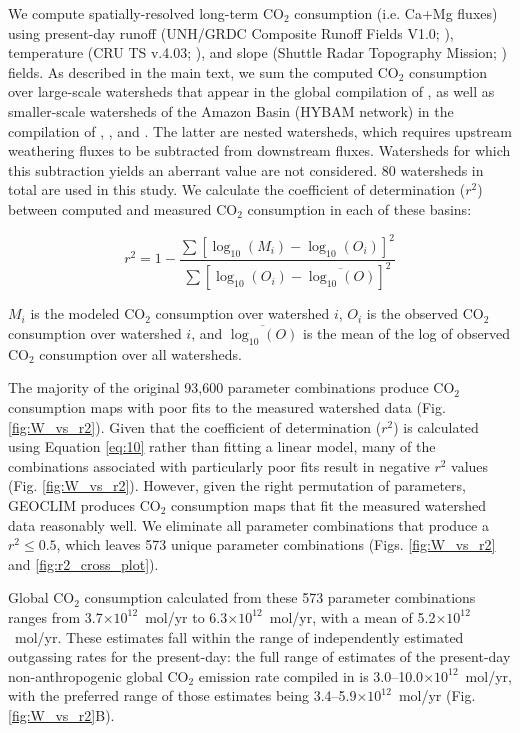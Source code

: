 \documentclass[11pt,letterpaper]{article}
\newcommand{\COtwo}{CO$_{2}$\xspace}
\begin{document}
We compute spatially-resolved long-term \COtwo consumption (i.e. Ca+Mg fluxes) using present-day runoff (UNH/GRDC Composite Runoff Fields V1.0; \citealp{Fekete1999a}), temperature (CRU TS v.4.03; \citealp{Harris2013a}), and slope (Shuttle Radar Topography Mission; \citealp{Farr2007a}) fields. As described in the main text, we sum the computed \COtwo consumption over large-scale watersheds that appear in the global compilation of \citet{Gaillardet1999a}, as well as smaller-scale watersheds of the Amazon Basin (HYBAM network) in the compilation of \citet{Moquet2011a}, \citet{Moquet2016a}, and \citet{Moquet2018a}. The latter are nested watersheds, which requires upstream weathering fluxes to be subtracted from downstream fluxes. Watersheds for which this subtraction yields an aberrant value are not considered. 80 watersheds in total are used in this study. We calculate the coefficient of determination ($r^{2}$) between computed and measured \COtwo consumption in each of these basins:

\begin{equation*}
    r^{2} = 1 - \frac{\sum\left[ \log_{10}(M_{i}) - \log_{10}(O_{i}) \right]^{2}}{\sum\left[ \log_{10}(O_{i}) - \overline{\log_{10}(O)} \right]^{2}}
    \label{eq:10}
\end{equation*}

\noindent
$M_{i}$ is the modeled \COtwo consumption over watershed $i$, $O_{i}$ is the observed \COtwo consumption over watershed $i$, and $\overline{\log_{10}(O)}$ is the mean of the log of observed \COtwo consumption over all watersheds.

The majority of the original 93,600 parameter combinations produce \COtwo consumption maps with poor fits to the measured watershed data (Fig. \ref{fig:W_vs_r2}). Given that the coefficient of determination ($r^{2}$) is calculated using Equation \ref{eq:10} rather than fitting a linear model, many of the combinations associated with particularly poor fits result in negative $r^{2}$ values (Fig. \ref{fig:W_vs_r2}). However, given the right permutation of parameters, GEOCLIM produces \COtwo consumption maps that fit the measured watershed data reasonably well. We eliminate all parameter combinations that produce a $r^{2}\leq0.5$, which leaves 573 unique parameter combinations (Figs. \ref{fig:W_vs_r2} and \ref{fig:r2_cross_plot}).

Global CO$_{2}$ consumption calculated from these 573 parameter combinations ranges from 3.7$\times10^{12}$~mol/yr to 6.3$\times10^{12}$~mol/yr, with a mean of 5.2$\times10^{12}$~mol/yr. These estimates fall within the range of independently estimated outgassing rates for the present-day: the full range of estimates of the present-day non-anthropogenic global CO$_{2}$ emission rate compiled in \citet{Gerlach2011a} is 3.0--10.0$\times10^{12}$~mol/yr, with the preferred range of those estimates being 3.4--5.9$\times10^{12}$~mol/yr (Fig. \ref{fig:W_vs_r2}B).
\end{document}
